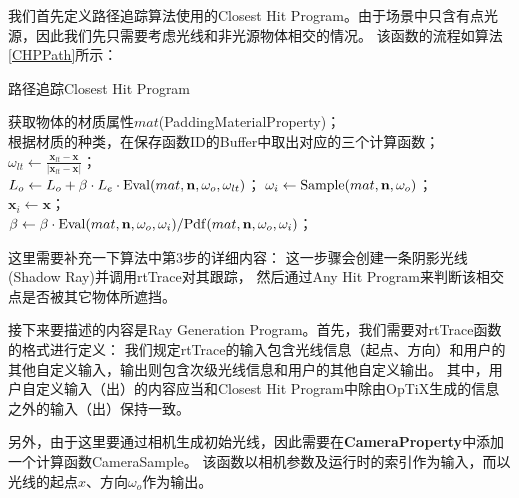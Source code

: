 我们首先定义路径追踪算法使用的Closest Hit Program。由于场景中只含有点光源，因此我们先只需要考虑光线和非光源物体相交的情况。
该函数的流程如算法\ref{CHPPath}所示：
\begin{algorithm}
    \caption{路径追踪Closest Hit Program}
    \label{CHPPath}

    获取物体的材质属性$mat$(PaddingMaterialProperty)；\\
    根据材质的种类，在保存函数ID的Buffer中取出对应的三个计算函数；\\
    {
        $\omega_{lt} \leftarrow \frac{\textbf{x}_{lt}-\textbf{x}}{|\textbf{x}_{lt}-\textbf{x}|}$；\\
        $L_o \leftarrow L_o+\beta\cdot L_e\cdot {\rm Eval}(mat, \textbf{n}, \omega_o, \omega_{lt}) $；
    }
    $\omega_i \leftarrow {\rm Sample}(mat, \textbf{n}, \omega_o)$；\\
    $\textbf{x}_i \leftarrow \textbf{x}$；\\
    $\beta \leftarrow \beta\cdot {\rm Eval}(mat, \textbf{n}, \omega_o, \omega_i)/ {\rm Pdf}(mat, \textbf{n}, \omega_o, \omega_i)$；\\
\end{algorithm}

这里需要补充一下算法中第3步的详细内容：
这一步骤会创建一条阴影光线(Shadow Ray)并调用rtTrace对其跟踪，
然后通过Any Hit Program来判断该相交点是否被其它物体所遮挡。

接下来要描述的内容是Ray Generation Program。首先，我们需要对rtTrace函数的格式进行定义：
我们规定rtTrace的输入包含光线信息（起点、方向）和用户的其他自定义输入，输出则包含次级光线信息和用户的其他自定义输出。
其中，用户自定义输入（出）的内容应当和Closest Hit Program中除由OpTiX生成的信息之外的输入（出）保持一致。

另外，由于这里要通过相机生成初始光线，因此需要在\textbf{CameraProperty}中添加一个计算函数CameraSample。
该函数以相机参数及运行时的索引作为输入，而以光线的起点$x$、方向$\omega_o$作为输出。

